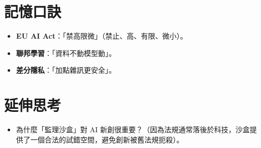 \documentclass[
  letterpaper,
  DIV=11,
  numbers=noendperiod]{scrreprt}
\providecommand{\tightlist}{%
  \setlength{\itemsep}{0pt}\setlength{\parskip}{0pt}}
\begin{document}
\section{記憶口訣}\label{ux8a18ux61b6ux53e3ux8a23-10}

\begin{itemize}
\tightlist
\item
  \textbf{EU AI Act}：「禁高限微」（禁止、高、有限、微小）。
\item
  \textbf{聯邦學習}：「資料不動模型動」。
\item
  \textbf{差分隱私}：「加點雜訊更安全」。
\end{itemize}

\section{延伸思考}\label{ux5ef6ux4f38ux601dux8003-10}

\begin{itemize}
\tightlist
\item
  為什麼「監理沙盒」對 AI
  新創很重要？（因為法規通常落後於科技，沙盒提供了一個合法的試錯空間，避免創新被舊法規扼殺）。
\end{itemize}
\end{document}
